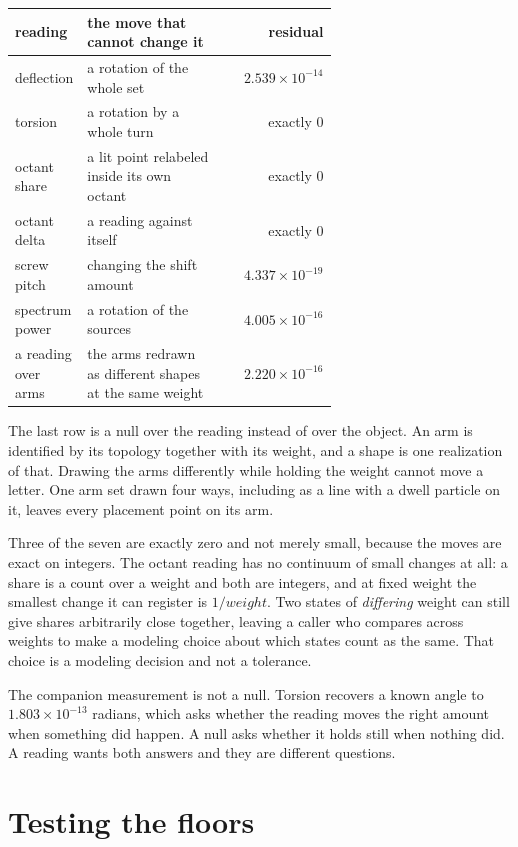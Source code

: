 \begin{center}
\begin{tabular}{@{}p{0.22\linewidth}p{0.42\linewidth}r@{}}
\toprule
reading & the move that cannot change it & residual \\
\midrule
deflection & a rotation of the whole set & \(2.539 \times 10^{-14}\) \\
torsion & a rotation by a whole turn & exactly 0 \\
octant share & a lit point relabeled inside its own octant & exactly 0 \\
octant delta & a reading against itself & exactly 0 \\
screw pitch & changing the shift amount & \(4.337 \times 10^{-19}\) \\
spectrum power & a rotation of the sources & \(4.005 \times 10^{-16}\) \\
a reading over arms & the arms redrawn as different shapes at the same weight & \(2.220 \times 10^{-16}\) \\
\bottomrule
\end{tabular}
\end{center}

The last row is a null over the reading instead of over the object. An arm is identified by its topology together with its weight, and a shape is one realization of that. Drawing the arms differently while holding the weight cannot move a letter. One arm set drawn four ways, including as a line with a dwell particle on it, leaves every placement point on its arm.

Three of the seven are exactly zero and not merely small, because the moves are exact on integers. The octant reading has no continuum of small changes at all: a share is a count over a weight and both are integers, and at fixed weight the smallest change it can register is \(1/\mathit{weight}\). Two states of \emph{differing} weight can still give shares arbitrarily close together, leaving a caller who compares across weights to make a modeling choice about which states count as the same. That choice is a modeling decision and not a tolerance.

The companion measurement is not a null. Torsion recovers a known angle to \(1.803 \times 10^{-13}\) radians, which asks whether the reading moves the right amount when something did happen. A null asks whether it holds still when nothing did. A reading wants both answers and they are different questions.

\section{Testing the floors}

